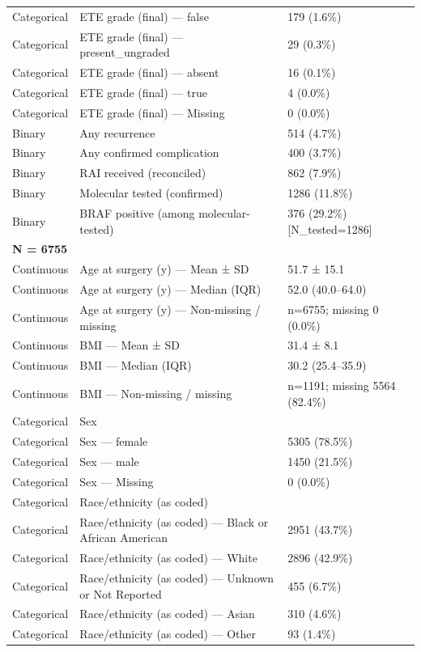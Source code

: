 \begin{table}[htbp]
\begin{tabular}{lll}
Categorical & ETE grade (final) — false & 179 (1.6\%) \\
Categorical & ETE grade (final) — present\_ungraded & 29 (0.3\%) \\
Categorical & ETE grade (final) — absent & 16 (0.1\%) \\
Categorical & ETE grade (final) — true & 4 (0.0\%) \\
Categorical & ETE grade (final) — Missing & 0 (0.0\%) \\
Binary & Any recurrence & 514 (4.7\%) \\
Binary & Any confirmed complication & 400 (3.7\%) \\
Binary & RAI received (reconciled) & 862 (7.9\%) \\
Binary & Molecular tested (confirmed) & 1286 (11.8\%) \\
Binary & BRAF positive (among molecular-tested) & 376 (29.2\%) [N\_tested=1286] \\
\multicolumn{3}{l}{\textbf{N = 6755}} \\
Continuous & Age at surgery (y) — Mean ± SD & 51.7 ± 15.1 \\
Continuous & Age at surgery (y) — Median (IQR) & 52.0 (40.0–64.0) \\
Continuous & Age at surgery (y) — Non-missing / missing & n=6755; missing 0 (0.0\%) \\
Continuous & BMI — Mean ± SD & 31.4 ± 8.1 \\
Continuous & BMI — Median (IQR) & 30.2 (25.4–35.9) \\
Continuous & BMI — Non-missing / missing & n=1191; missing 5564 (82.4\%) \\
Categorical & Sex &  \\
Categorical & Sex — female & 5305 (78.5\%) \\
Categorical & Sex — male & 1450 (21.5\%) \\
Categorical & Sex — Missing & 0 (0.0\%) \\
Categorical & Race/ethnicity (as coded) &  \\
Categorical & Race/ethnicity (as coded) — Black or African American & 2951 (43.7\%) \\
Categorical & Race/ethnicity (as coded) — White & 2896 (42.9\%) \\
Categorical & Race/ethnicity (as coded) — Unknown or Not Reported & 455 (6.7\%) \\
Categorical & Race/ethnicity (as coded) — Asian & 310 (4.6\%) \\
Categorical & Race/ethnicity (as coded) — Other & 93 (1.4\%) \\

\end{tabular}
\end{table}
